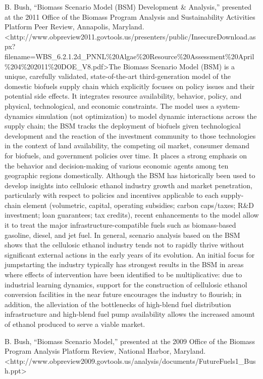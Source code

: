 \documentclass[]{article}
\begin{document}
B. Bush, ``Biomass Scenario Model (BSM) Development \& Analysis,''
presented at the 2011 Office of the Biomass Program Analysis and
Sustainability Activities Platform Peer Review, Annapolis, Maryland.
\textless{}http://www.obpreview2011.govtools.us/presenters/public/InsecureDownload.aspx?filename=WBS\_6.2.1.2d\_PNNL\%20Algae\%20Resource\%20Assessment\%20April\%204\%202011\%20DOE\_V8.pdf\textgreater{}The
Biomass Scenario Model (BSM) is a unique, carefully validated,
state-of-the-art third-generation model of the domestic biofuels supply
chain which explicitly focuses on policy issues and their potential side
effects. It integrates resource availability, behavior, policy, and
physical, technological, and economic constraints. The model uses a
system-dynamics simulation (not optimization) to model dynamic
interactions across the supply chain; the BSM tracks the deployment of
biofuels given technological development and the reaction of the
investment community to those technologies in the context of land
availability, the competing oil market, consumer demand for biofuels,
and government policies over time. It places a strong emphasis on the
behavior and decision-making of various economic agents among ten
geographic regions domestically. Although the BSM has historically been
used to develop insights into cellulosic ethanol industry growth and
market penetration, particularly with respect to policies and incentives
applicable to each supply-chain element (volumetric, capital, operating
subsidies; carbon caps/taxes; R\&D investment; loan guarantees; tax
credits), recent enhancements to the model allow it to treat the major
infrastructure-compatible fuels such as biomass-based gasoline, diesel,
and jet fuel. In general, scenario analysis based on the BSM shows that
the cellulosic ethanol industry tends not to rapidly thrive without
significant external actions in the early years of its evolution. An
initial focus for jumpstarting the industry typically has strongest
results in the BSM in areas where effects of intervention have been
identified to be multiplicative: due to industrial learning dynamics,
support for the construction of cellulosic ethanol conversion facilities
in the near future encourages the industry to flourish; in addition, the
alleviation of the bottlenecks of high-blend fuel distribution
infrastructure and high-blend fuel pump availability allows the
increased amount of ethanol produced to serve a viable market.

B. Bush, ``Biomass Scenario Model,'' presented at the 2009 Office of the
Biomass Program Analysis Platform Review, National Harbor, Maryland.
\textless{}http://www.obpreview2009.govtools.us/analysis/documents/FutureFuels1\_Bush.ppt\textgreater{}
\end{document}
